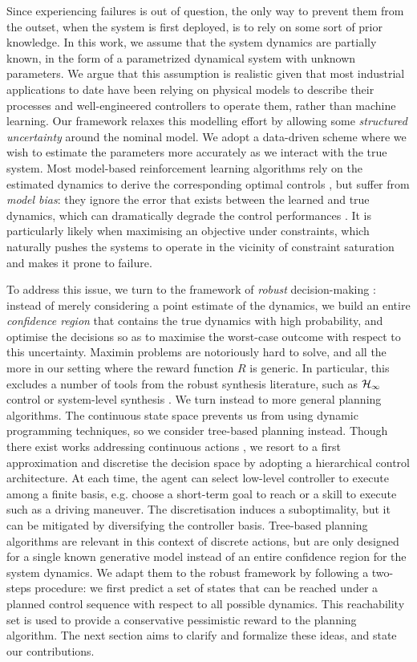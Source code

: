 \documentclass{article}
\begin{document}
Since experiencing failures is out of question, the only way to prevent them from the outset, when the system is first deployed, is to rely on some sort of prior knowledge. In this work, we assume that the system dynamics are partially known, in the form of a parametrized dynamical system with unknown parameters. We argue that this assumption is realistic given that most industrial applications to date have been relying on physical models to describe their processes and well-engineered controllers to operate them, rather than machine learning. Our framework relaxes this modelling effort by allowing some \emph{structured uncertainty} around the nominal model. We adopt a data-driven scheme where we wish to estimate the parameters more accurately as we interact with the true system. Most model-based reinforcement learning algorithms rely on the estimated dynamics to derive the corresponding optimal controls \citep[e.g.][]{Lenz2015,Levine2015}, but suffer from \emph{model bias}: they ignore the error that exists between the learned and true dynamics, which can dramatically degrade the control performances \citep{Schneider1997}. It is particularly likely when maximising an objective under constraints, which naturally pushes the systems to operate in the vicinity of constraint saturation and makes it prone to failure.

To address this issue, we turn to the framework of \emph{robust} decision-making \citep{Bental2009,Bertsimas2011,Gorissen2015}: instead of merely considering a point estimate of the dynamics, we build an entire \emph{confidence region} that contains the true dynamics with high probability, and optimise the decisions so as to maximise the worst-case outcome with respect to this uncertainty. Maximin problems are notoriously hard to solve, and all the more in our setting where the reward function $R$ is generic. In particular, this excludes a number of tools from the robust synthesis literature, such as $\mathcal{H}_\infty$ control \citep[see, e.g.][]{Basar1996} or system-level synthesis \citep{Dean2017,Dean2018}. We turn instead to more general planning algorithms. The continuous state space prevents us from using dynamic programming techniques, so we consider tree-based planning instead. Though there exist works addressing continuous actions \citep{Busoniu2018,Weinstein2012}, we resort to a first approximation and discretise the decision space by adopting a hierarchical control architecture. At each time, the agent can select low-level controller to execute among a finite basis, e.g. choose a short-term goal to reach or a skill to execute such as a driving maneuver. The discretisation induces a suboptimality, but it can be mitigated by diversifying the controller basis. Tree-based planning algorithms are relevant in this context of discrete actions, but are only designed for a single known generative model instead of an entire confidence region for the system dynamics. We adapt them to the robust framework by following a two-steps procedure: we first predict a set of states that can be reached under a planned control sequence with respect to all possible dynamics. This reachability set is used to provide a conservative pessimistic reward to the planning algorithm. The next section aims to clarify and formalize these ideas, and state our contributions.
\end{document}
